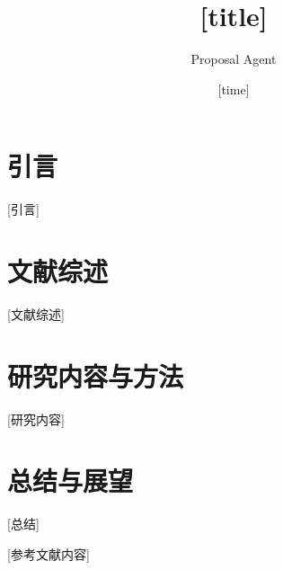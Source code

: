 \documentclass{phdproposal}
\title{[title]}
\author{Proposal Agent}
\date{[time]}
\begin{document}
\frontmatter

\maketitle

\clearpage
{}

\maketoc[nopagenum]

\clearpage
{}

\mainmatter


\chapter{引言}

[引言]

\chapter{文献综述}

[文献综述]

\chapter{研究内容与方法}

[研究内容]

\chapter{总结与展望}

[总结]


\backmatter


[参考文献内容]
% 
% 
\end{document}
